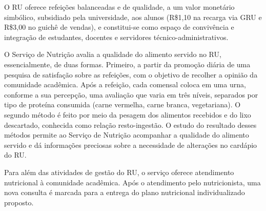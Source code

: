 O RU oferece refeições balanceadas e de qualidade, a um valor monetário simbólico, subsidiado pela universidade, aos alunos (R\$1,10 na recarga via GRU e R\$3,00 no guichê de vendas), e constitui-se como espaço de convivência e integração de estudantes, docentes e servidores técnico-administrativos.


O Serviço de Nutrição avalia a qualidade do alimento servido no RU, essencialmente, de duas formas. Primeiro, a partir da promoção diária de uma pesquisa de satisfação sobre as refeições, com o objetivo de recolher a opinião da comunidade acadêmica. Após a refeição, cada comensal coloca em uma urna, conforme a sua percepção, uma avaliação que varia em três níveis, separados por tipo de proteína consumida (carne vermelha, carne branca, vegetariana). O segundo método é feito por meio da pesagem dos alimentos recebidos e do lixo descartado, conhecida como relação resto-ingestão. O estudo do resultado desses métodos permite ao Serviço de Nutrição acompanhar a qualidade do alimento servido e dá informações preciosas sobre a necessidade de alterações no cardápio do RU.

Para além das atividades de gestão do RU, o serviço oferece atendimento nutricional à comunidade acadêmica. Após o atendimento pelo nutricionista, uma nova consulta é marcada para a entrega do plano nutricional individualizado proposto. %


